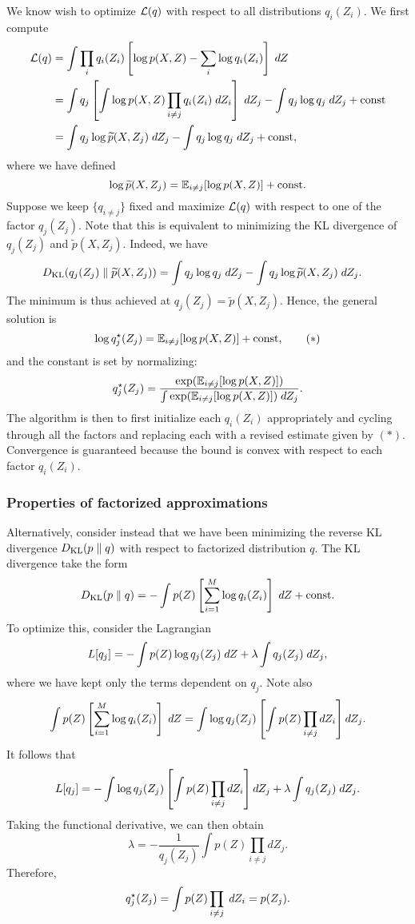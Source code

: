 \documentclass[a4paper]{article}
\begin{document}
We know wish to optimize $\mathcal{L}(q)$ with respect to all distributions
$q_i(Z_i)$. We first compute
\[
\begin{aligned}
\mathcal{L}(q)
&= \int \prod_i q_i(Z_i) \left[ \log p(X, Z) - \sum_i
\log q_i(Z_i) \right] \; d Z \\
&= \int q_j \left[ \int \log p(X, Z) \prod_{i \neq j}
q_i(Z_i) \; d Z_i \right] \; d Z_j
- \int q_j \log q_j \; d Z_j + \mathrm{const} \\
&= \int q_j \log \widetilde{p} (X, Z_j) \; d Z_j
- \int q_j \log q_j \; d Z_j + \mathrm{const},
\end{aligned}
\]
where we have defined
\[
\log \widetilde{p} (X, Z_j) = \mathbb{E}_{i \neq j}
[\log p(X, Z)] + \mathrm{const}.
\]
Suppose we keep $\{q_{i \neq j}\}$ fixed and maximize
$\mathcal{L}(q)$ with respect to one of the factor
$q_j(Z_j)$. Note that this is equivalent
to minimizing the KL divergence of $q_j(Z_j)$ and $\tilde{p}
(X, Z_j)$. Indeed, we have 
\[
\begin{aligned}
D_{\text{KL}}(q_j (Z_j) \; \Vert \; \widetilde{p}(X, Z_j)) 
&= \int q_j \log q_j \; d Z_j 
- \int q_j \log \widetilde{p} (X, Z_j) \; d Z_j. 
\end{aligned}
\]
The minimum is thus achieved at $q_j(Z_j)
= \tilde{p} (X, Z_j)$. Hence, the general solution is
\begin{equation*}
  \log q_j^\star (Z_j) = \mathbb{E}_{i \neq j} [\log p(X, Z)] +
  \mathrm{const},
  \tag{$*$}
\end{equation*}
and the constant is set by normalizing:
\[
q^\star_j(Z_j)
= \frac{\exp (\mathbb{E}_{i \neq j} [\log p(X, Z)])}
{\int \exp (\mathbb{E}_{i \neq j} [\log p(X, Z)]) \; d Z_j}.
\]
The algorithm is then to first initialize each $q_i (Z_i)$
appropriately and cycling through all the factors and
replacing each with a revised estimate given by $(*)$.
Convergence is guaranteed because the bound is convex
with respect to each factor $q_i(Z_i)$.

\subsubsection{Properties of factorized approximations}

Alternatively, consider instead that we have been minimizing 
the reverse KL divergence $D_{\text{KL}}(p \; \Vert \; q)$ with respect to 
factorized distribution $q$. The KL divergence
take the form 
\[
D_{\text{KL}}(p \; \Vert \; q) = - \int p(Z) \left[ \sum_{i=1}^M \log q_i 
(Z_i) \right] \; d Z + \mathrm{const}.
\]
To optimize this, consider the Lagrangian 
\[
\begin{aligned}
L[q_j] = - \int p(Z) \log q_j(Z_j) \; d Z + 
\lambda \int q_j (Z_j) \; d Z_j,
\end{aligned}
\]
where we have kept only the terms dependent on $q_j$. 
Note also
\[
\begin{aligned}
\int p(Z) \left[ \sum_{i=1}^M \log q_i (Z_i) \right] \; d Z 
= \int \log q_j(Z_j) \left[ \int p(Z) \prod_{i \neq j} 
d Z_i \right] d Z_j.
\end{aligned}
\]
It follows that
\[
L[q_j] = -\int \log q_j(Z_j) \left[ \int p(Z) \prod_{i \neq j} 
d Z_i \right] d Z_j + \lambda \int q_j(Z_j) \; d Z_j.
\]
Taking the functional derivative, we can then obtain
\[
\lambda = 
- \frac{1}{q_j(Z_j)} \int p(Z) \prod_{i \neq j} d Z_j.
\]
Therefore, 
\[
q_j^\star (Z_j) = \int p(Z) \prod_{i \neq j} \; d Z_i = p(Z_j).
\]
\end{document}

